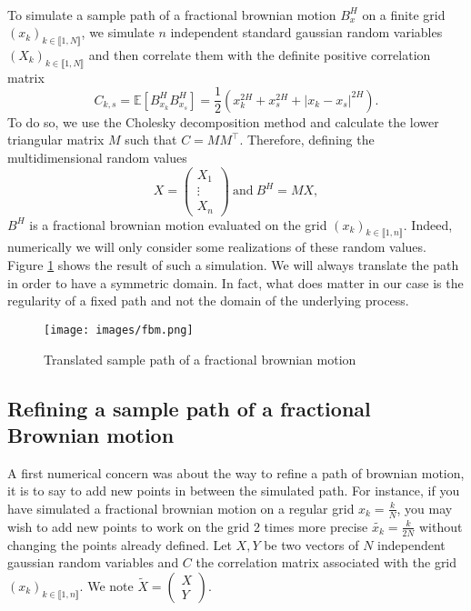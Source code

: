 \documentclass[11pt]{enstaPRE}
\newcommand{\E}{\mathbb{E}}
\begin{document}
\paragraph{}
To simulate a sample path of a fractional brownian motion $B^H_x$ on a finite grid $(x_k)_{k\in\llbracket1,N\rrbracket}$, we simulate $n$ independent standard gaussian random variables $(X_k)_{k\in\llbracket1,N\rrbracket}$ and then correlate them with the definite positive correlation matrix 
$$C_{k,s}=\E\left[B_{x_k}^HB_{x_s}^H\right]=\frac{1}{2}\left(x_k^{2H}+x_s^{2H}+|x_k-x_s|^{2H}\right).$$
To do so, we use the Cholesky decomposition method and calculate the lower triangular matrix $M$ such that $C=MM^\top$. Therefore, defining the multidimensional random values
$$X = \begin{pmatrix}
X_1 \\ \vdots \\ X_n
\end{pmatrix}\ \mathrm{and}\ B^H = MX,$$
$B^H$ is a fractional brownian motion evaluated on the grid $(x_k)_{k\in\llbracket1,n\rrbracket}$. Indeed, numerically we will only consider some realizations of these random values. Figure \ref{fbm} shows the result of such a simulation. We will always translate the path in order to have a symmetric domain. In fact, what does matter in our case is the regularity of a fixed path and not the domain of the underlying process.

\begin{figure}
    \centering
    \texttt{[image: images/fbm.png]}
    \caption{ \label{fbm} Translated sample path of a fractional brownian motion}
\end{figure}

\subsection{Refining a sample path of a fractional Brownian motion}

A first numerical concern was about the way to refine a path of brownian motion, it is to say to add new points in between the simulated path. For instance, if you have simulated a fractional brownian motion on a regular grid $x_k = \frac{k}{N}$, you may wish to add new points to work on the grid 2 times more precise $\widetilde{x_k} = \frac{k}{2N}$ without changing the points already defined. Let $X,Y$ be two vectors of $N$ independent gaussian random variables and $C$ the correlation matrix associated with the grid $(x_k)_{k\in\llbracket1,n\rrbracket}$. We note $\widetilde{X} = \begin{pmatrix}
X \\ Y
\end{pmatrix}$.
\end{document}
